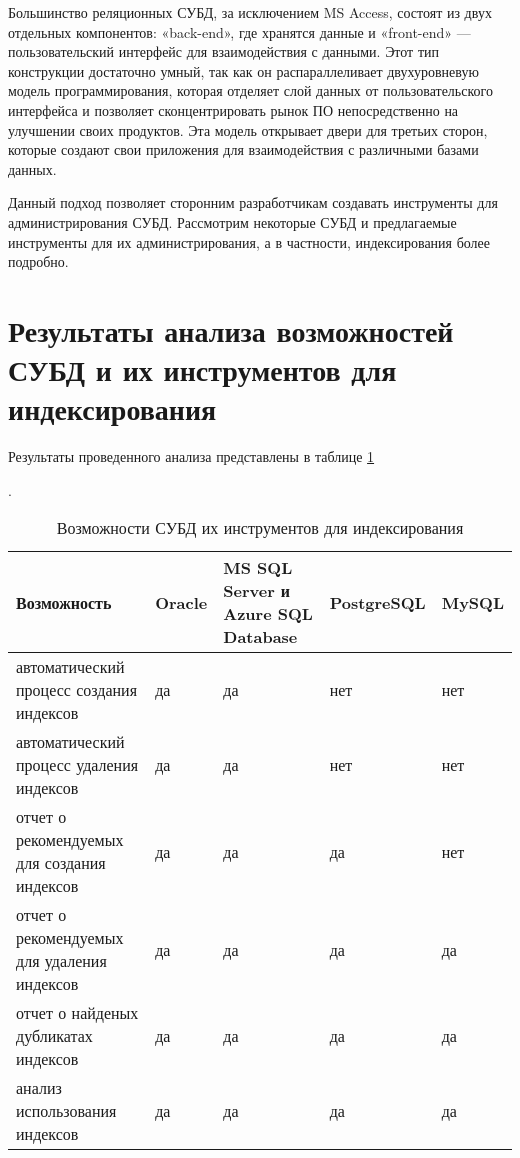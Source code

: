Большинство реляционных СУБД, за исключением MS Access, состоят из двух отдельных компонентов: «back-end», где хранятся данные и «front-end» — пользовательский интерфейс для взаимодействия с данными. Этот тип конструкции достаточно умный, так как он распараллеливает двухуровневую модель программирования, которая отделяет слой данных от пользовательского интерфейса и позволяет сконцентрировать рынок ПО непосредственно на улучшении своих продуктов. Эта модель открывает двери для третьих сторон, которые создают свои приложения для взаимодействия с различными базами данных. \cite{habrahabr.ru:10_best_tools} 

Данный подход позволяет сторонним разработчикам создавать инструменты для администрирования СУБД. Рассмотрим некоторые СУБД и предлагаемые инструменты для их администрирования, а в частности, индексирования более подробно.









\section{Результаты анализа возможностей СУБД и их инструментов для индексирования}

Результаты проведенного анализа представлены в таблице  \ref{table:dbms_and_tools_for_indexes}

\begin{table}[h]
\caption{Возможности СУБД их инструментов для индексирования}\label{table:dbms_and_tools_for_indexes}.
\medskip
\begin{tabular}{|p{4cm}|p{2cm}|p{2cm}|p{2cm}|p{2cm}|}
\hline
Возможность & Oracle & MS SQL Server и Azure SQL Database & PostgreSQL & MySQL\\
\hline
автоматический процесс создания индексов & да & да & нет & нет\\
\hline
автоматический процесс удаления индексов & да & да & нет & нет\\
\hline
отчет о рекомендуемых для создания индексов & да & да & да & нет\\
\hline
отчет о рекомендуемых для удаления индексов & да & да & да & да\\
\hline
отчет о найденых дубликатах индексов & да & да & да & да\\
\hline
анализ использования индексов & да & да & да & да\\
\hline
\end{tabular}
\end{table}

